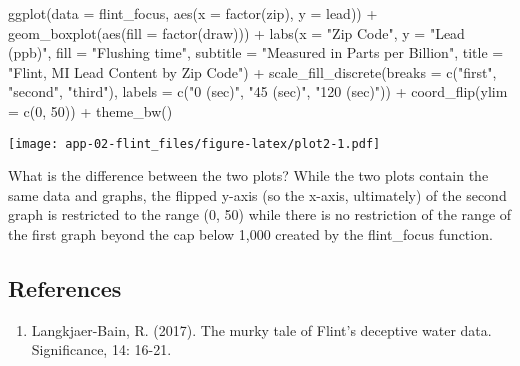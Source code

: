 \documentclass[
]{article}
\newenvironment{Shaded}{\begin{snugshade}}{\end{snugshade}}
\newcommand{\AttributeTok}[1]{\textcolor[rgb]{0.77,0.63,0.00}{#1}}
\newcommand{\DecValTok}[1]{\textcolor[rgb]{0.00,0.00,0.81}{#1}}
\newcommand{\FunctionTok}[1]{\textcolor[rgb]{0.00,0.00,0.00}{#1}}
\newcommand{\NormalTok}[1]{#1}
\newcommand{\SpecialCharTok}[1]{\textcolor[rgb]{0.00,0.00,0.00}{#1}}
\newcommand{\StringTok}[1]{\textcolor[rgb]{0.31,0.60,0.02}{#1}}
\providecommand{\tightlist}{%
  \setlength{\itemsep}{0pt}\setlength{\parskip}{0pt}}
\begin{document}
\begin{Shaded}
\begin{Highlighting}[]
\FunctionTok{ggplot}\NormalTok{(}\AttributeTok{data =}\NormalTok{ flint\_focus, }\FunctionTok{aes}\NormalTok{(}\AttributeTok{x =} \FunctionTok{factor}\NormalTok{(zip), }\AttributeTok{y =}\NormalTok{ lead)) }\SpecialCharTok{+}
  \FunctionTok{geom\_boxplot}\NormalTok{(}\FunctionTok{aes}\NormalTok{(}\AttributeTok{fill =} \FunctionTok{factor}\NormalTok{(draw))) }\SpecialCharTok{+} 
  \FunctionTok{labs}\NormalTok{(}\AttributeTok{x =} \StringTok{"Zip Code"}\NormalTok{, }\AttributeTok{y =} \StringTok{"Lead (ppb)"}\NormalTok{, }\AttributeTok{fill =} \StringTok{"Flushing time"}\NormalTok{,}
       \AttributeTok{subtitle =} \StringTok{"Measured in Parts per Billion"}\NormalTok{, }\AttributeTok{title =} \StringTok{"Flint, MI Lead Content by Zip Code"}\NormalTok{) }\SpecialCharTok{+}
  \FunctionTok{scale\_fill\_discrete}\NormalTok{(}\AttributeTok{breaks =} \FunctionTok{c}\NormalTok{(}\StringTok{"first"}\NormalTok{, }\StringTok{"second"}\NormalTok{, }\StringTok{"third"}\NormalTok{),}
                      \AttributeTok{labels =} \FunctionTok{c}\NormalTok{(}\StringTok{"0 (sec)"}\NormalTok{, }\StringTok{"45 (sec)"}\NormalTok{, }\StringTok{"120 (sec)"}\NormalTok{)) }\SpecialCharTok{+}
  \FunctionTok{coord\_flip}\NormalTok{(}\AttributeTok{ylim =} \FunctionTok{c}\NormalTok{(}\DecValTok{0}\NormalTok{, }\DecValTok{50}\NormalTok{)) }\SpecialCharTok{+}
  \FunctionTok{theme\_bw}\NormalTok{()}
\end{Highlighting}
\end{Shaded}

\texttt{[image: app-02-flint\_files/figure-latex/plot2-1.pdf]}

What is the difference between the two plots? While the two plots
contain the same data and graphs, the flipped y-axis (so the x-axis,
ultimately) of the second graph is restricted to the range (0, 50) while
there is no restriction of the range of the first graph beyond the cap
below 1,000 created by the flint\_focus function.

\hypertarget{references}{%
\subsection{References}\label{references}}

\begin{enumerate}
\def\labelenumi{\arabic{enumi}.}
\tightlist
\item
  Langkjaer-Bain, R. (2017). The murky tale of Flint's deceptive water
  data. Significance, 14: 16-21.
\end{enumerate}
\end{document}
